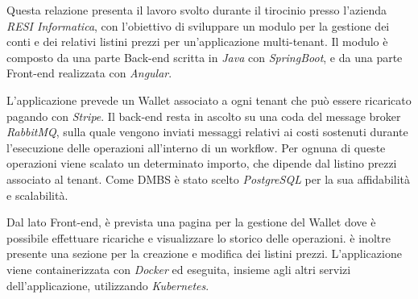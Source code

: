 Questa relazione presenta il lavoro svolto durante il tirocinio presso l'azienda \textit{RESI Informatica}, con l'obiettivo di sviluppare un modulo per la gestione
dei conti e dei relativi listini prezzi per un'applicazione multi-tenant. Il modulo \`e composto da una parte Back-end scritta in \textit{Java} con \textit{SpringBoot}, e da una parte Front-end realizzata con \textit{Angular}.

L'applicazione prevede un Wallet associato a ogni tenant che pu\`o essere ricaricato pagando con \textit{Stripe}.
Il back-end resta in ascolto su una coda del message broker \textit{RabbitMQ}, sulla quale vengono inviati messaggi relativi ai costi sostenuti durante l'esecuzione delle operazioni all'interno di un workflow.
Per ognuna di queste operazioni viene scalato un determinato importo, che dipende dal listino prezzi associato al tenant.
Come DMBS \`e stato scelto \textit{PostgreSQL} per la sua affidabilit\`a e scalabilit\`a.

Dal lato Front-end, \`e prevista una pagina per la gestione del Wallet dove \`e possibile effettuare ricariche e visualizzare lo storico delle operazioni.
\`e inoltre presente una sezione per la creazione e modifica dei listini prezzi.
L'applicazione viene containerizzata con \textit{Docker} ed eseguita, insieme agli altri servizi dell'applicazione, utilizzando \textit{Kubernetes}.
